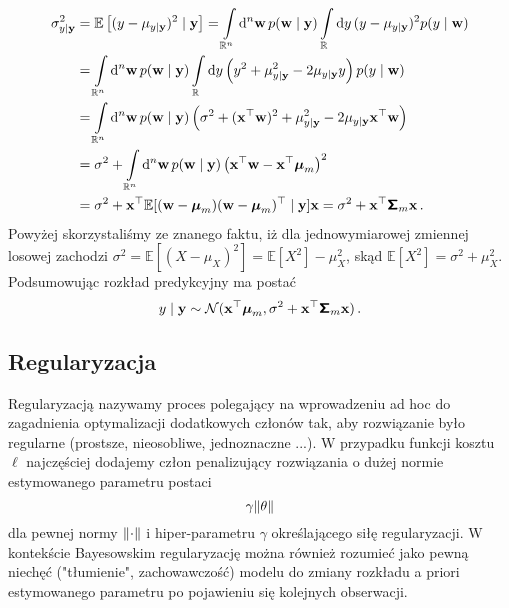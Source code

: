 \documentclass{myclass}
\begin{document}
\begin{equation*}
    \begin{split}
        \sigma_{y|\mathbf{y}}^2 &= \mathbb{E}\left[(y - \mu_{y|\mathbf{y}} )^2 \mid \mathbf{y}\right] = \int\limits_{\mathbb{R}^n}\dd[n]{\mathbf{w}} p(\mathbf{w}\mid\mathbf{y}) \int\limits_\mathbb{R}\dd{y} (y-\mu_{y|\mathbf{y}})^2p(y\mid\mathbf{w})\\
        &= \int\limits_{\mathbb{R}^n}\dd[n]{\mathbf{w}} p(\mathbf{w}\mid\mathbf{y}) \int\limits_\mathbb{R}\dd{y} \left(y^2 + \mu_{y|\mathbf{y}}^2 - 2\mu_{y|\mathbf{y}}y\right)p(y\mid\mathbf{w})\\
        &= \int\limits_{\mathbb{R}^n}\dd[n]{\mathbf{w}} p(\mathbf{w}\mid\mathbf{y}) \left(\sigma^2 + (\mathbf{x}^\top\mathbf{w})^2 + \mu_{y|\mathbf{y}}^2 - 2\mu_{y|\mathbf{y}}\mathbf{x}^\top\mathbf{w}\right)\\
        &=\sigma^2 + \int\limits_{\mathbb{R}^n}\dd[n]{\mathbf{w}} p(\mathbf{w}\mid\mathbf{y}) \left(\mathbf{x}^\top\mathbf{w} - \mathbf{x}^\top\boldsymbol{\mu}_m\right)^2\\
        &=\sigma^2 + \mathbf{x}^\top \mathbb{E}[(\mathbf{w}-\boldsymbol{\mu}_m)(\mathbf{w}-\boldsymbol{\mu}_m)^\top\mid\mathbf{y}]\mathbf{x} = \sigma^2 +\mathbf{x}^\top\boldsymbol{\mathsf{\Sigma}}_m\mathbf{x}\,.
    \end{split}
\end{equation*}
Powyżej skorzystaliśmy ze znanego faktu, iż dla jednowymiarowej zmiennej losowej zachodzi \(\sigma^2
= \mathbb{E}[(X - \mu_X)^2] = \mathbb{E}[X^2] - \mu_X^2\), skąd \(\mathbb{E}[X^2] = \sigma^2 +
\mu_X^2\). Podsumowując rozkład predykcyjny ma postać
\begin{equation*}
    y \mid \mathbf{y} \sim \mathcal{N}(\mathbf{x}^\top\boldsymbol{\mu}_m, \sigma^2 + \mathbf{x}^\top\boldsymbol{\mathsf{\Sigma}}_m\mathbf{x})\,.
\end{equation*}

\subsection{Regularyzacja}

Regularyzacją nazywamy proces polegający na wprowadzeniu ad hoc do zagadnienia optymalizacji
dodatkowych członów tak, aby rozwiązanie było regularne (prostsze, nieosobliwe, jednoznaczne ...). W
przypadku funkcji kosztu \(\ell\) najczęściej dodajemy człon penalizujący rozwiązania o dużej normie
estymowanego parametru postaci
\begin{equation*}
    \gamma\norm{\theta}
\end{equation*}
dla pewnej normy \(\norm{\cdot}\) i hiper-parametru \(\gamma\) określającego siłę regularyzacji. W
kontekście Bayesowskim regularyzację można również rozumieć jako pewną niechęć ("tłumienie",
zachowawczość) modelu do zmiany rozkładu a priori estymowanego parametru po pojawieniu się kolejnych
obserwacji.
\end{document}
